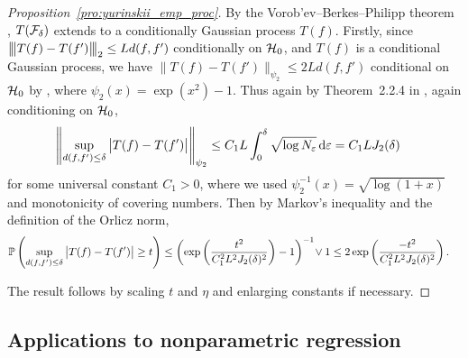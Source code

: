 \begin{proof}[Proposition~\ref{pro:yurinskii_emp_proc}]

  By the Vorob'ev--Berkes--Philipp theorem
  \citep{dudley1999uniform},
  $T(\cF_\delta)$ extends to a conditionally Gaussian process $T(f)$.
  Firstly, since
  $\bigvvvert T(f) - T(f') \bigvvvert_2 \leq L d(f,f')$
  conditionally on $\cH_0$,
  and $T(f)$ is a conditional Gaussian process, we have
  $\big\| T(f) - T(f') \big\|_{\psi_2} \leq 2 L d(f,f')$
  conditional on $\cH_0$
  by \citet[Chapter~2.2, Complement~1]{van1996weak},
  where $\psi_2(x) = \exp(x^2) - 1$.
  Thus again by Theorem~2.2.4 in \citet{van1996weak},
  again conditioning on $\cH_0$,
  \begin{align*}
    \left\|
    \sup_{d(f,f') \leq \delta}
    \big| T(f) - T(f') \big|
    \right\|_{\psi_2}
    &\leq
    C_1 L
    \int_0^\delta
    \sqrt{\log N_\varepsilon} \diff{\varepsilon}
    = C_1 L J_2(\delta)
  \end{align*}
  for some universal constant $C_1 > 0$,
  where we used $\psi_2^{-1}(x) = \sqrt{\log(1+x)}$
  and monotonicity of covering numbers.
  Then by Markov's inequality and the definition of the Orlicz norm,
  \begin{align*}
    \P\left(
      \sup_{d(f,f') \leq \delta}
      \big| T(f) - T(f') \big|
      \geq t
    \right)
    &\leq
    \left(
      \exp\left(
        \frac{t^2}{C_1^2 L^2 J_2(\delta)^2}
      \right) - 1
    \right)^{-1}
    \!\vee 1
    \leq
    2 \exp\left(
      \frac{-t^2}{C_1^2 L^2 J_2(\delta)^2}
    \right).
  \end{align*}


  The result follows by scaling $t$ and $\eta$
  and enlarging constants if necessary.
\end{proof}

\subsection{Applications to nonparametric regression}

